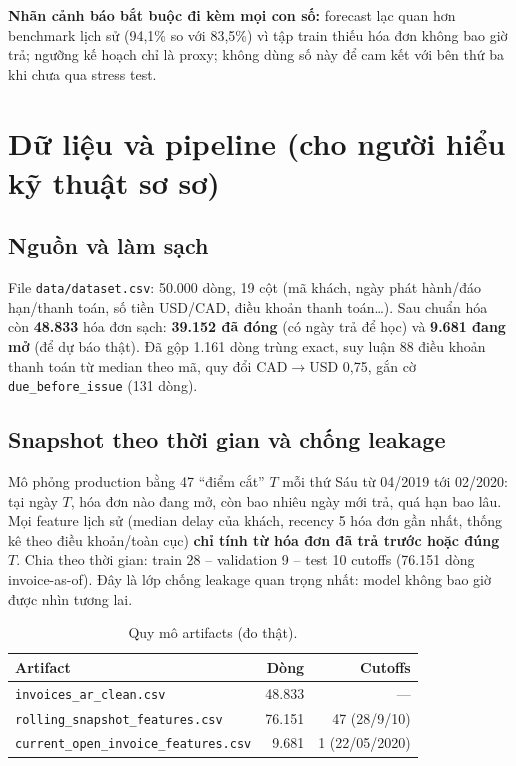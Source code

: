 \documentclass[12pt,a4paper]{article}
\begin{document}
\textbf{Nhãn cảnh báo bắt buộc đi kèm mọi con số:} forecast lạc quan hơn benchmark lịch sử
(94,1\% so với 83,5\%) vì tập train thiếu hóa đơn không bao giờ trả; ngưỡng kế hoạch chỉ là proxy;
không dùng số này để cam kết với bên thứ ba khi chưa qua stress test.

\section{Dữ liệu và pipeline (cho người hiểu kỹ thuật sơ sơ)}
\label{sec:data}

\subsection{Nguồn và làm sạch}
File \texttt{data/dataset.csv}: 50.000 dòng, 19 cột (mã khách, ngày phát hành/đáo hạn/thanh toán,
số tiền USD/CAD, điều khoản thanh toán\dots).
Sau chuẩn hóa còn \textbf{48.833} hóa đơn sạch: \textbf{39.152 đã đóng} (có ngày trả để học)
và \textbf{9.681 đang mở} (để dự báo thật). Đã gộp 1.161 dòng trùng exact, suy luận 88 điều khoản
thanh toán từ median theo mã, quy đổi CAD$\to$USD 0,75, gắn cờ \texttt{due\_before\_issue} (131 dòng).

\subsection{Snapshot theo thời gian và chống leakage}
Mô phỏng production bằng 47 ``điểm cắt'' $T$ mỗi thứ Sáu từ 04/2019 tới 02/2020:
tại ngày $T$, hóa đơn nào đang mở, còn bao nhiêu ngày mới trả, quá hạn bao lâu.
Mọi feature lịch sử (median delay của khách, recency 5 hóa đơn gần nhất, thống kê theo
điều khoản/toàn cục) \textbf{chỉ tính từ hóa đơn đã trả trước hoặc đúng $T$}.
Chia theo thời gian: train 28 -- validation 9 -- test 10 cutoffs (76.151 dòng invoice-as-of).
Đây là lớp chống leakage quan trọng nhất: model không bao giờ được nhìn tương lai.

\begin{table}[h]\centering
\caption{Quy mô artifacts (đo thật).}
\label{tab:scale-data}
\begin{tabular}{lrr}\toprule
Artifact & Dòng & Cutoffs \\\midrule
\texttt{invoices\_ar\_clean.csv} & 48.833 & --- \\
\texttt{rolling\_snapshot\_features.csv} & 76.151 & 47 (28/9/10) \\
\texttt{current\_open\_invoice\_features.csv} & 9.681 & 1 (22/05/2020) \\\bottomrule
\end{tabular}
\end{table}
\end{document}
